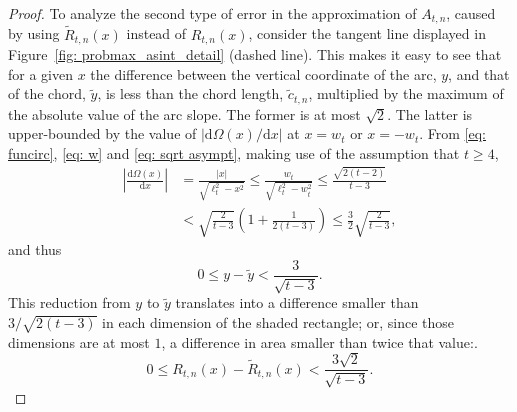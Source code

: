 \documentclass[12pt, a4paper]{article}
\newcommand{\diff}{\mathrm d}
\newcommand{\len}{\ell} %
\newcommand{\tiles}{t} %
\newcommand{\funcirc}{\Omega}
\begin{document}
\begin{proof}
To analyze the second type of error in the approximation of $A_{\tiles,n}$, caused by using $\tilde R_{\tiles,n}(x)$ instead of $R_{\tiles,n}(x)$, consider the tangent line displayed in Figure~\ref{fig: probmax_asint_detail} (dashed line). This makes it easy to see that for a given $x$ the difference between the vertical coordinate of the arc, $y$, and that of the chord, $\tilde y$, is less than the chord length, $\tilde c_{\tiles,n}$, multiplied by the maximum of the absolute value of the arc slope. The former is at most $\sqrt{2}$. The latter is upper-bounded by the value of $|\diff \funcirc(x)/\diff x|$ at $x=w_\tiles$ or $x=-w_\tiles$. From \eqref{eq: funcirc}, \eqref{eq: w} and \eqref{eq: sqrt asympt}, making use of the assumption that $\tiles \geq 4$,
\begin{equation}
\label{eq: asympt slope bound}
\begin{split}
\left| \frac{\diff \funcirc(x)}{\diff x} \right| &= \frac{|x|}{\sqrt{\len_\tiles^2-x^2}} \leq \frac{w_\tiles}{\sqrt{\len_\tiles^2-w_\tiles^2}} \leq \frac{\sqrt{2(\tiles-2)}}{\tiles-3} \\
& < \sqrt{\frac 2 {\tiles-3}} \left(1 + \frac 1 {2(\tiles-3)} \right) \leq \frac 3 2 \sqrt{\frac 2 {\tiles-3}},
\end{split}
\end{equation}
and thus
\begin{equation}
\label{eq: y: arc - chord}
0 \leq y - \tilde y < \frac 3 {\sqrt{\tiles-3}}.
\end{equation}
This reduction from $y$ to $\tilde y$ translates into a difference smaller than $3 / \sqrt{2(\tiles-3)}$ in each dimension of the shaded rectangle; or, since those dimensions are at most $1$, a difference in area smaller than twice that value:.
\begin{equation}
\label{eq: R: arc - chord}
0 \leq R_{\tiles,n}(x) - \tilde R_{\tiles,n}(x) < \frac{3\sqrt{2}} {\sqrt{\tiles-3}}.
\end{equation}


\end{proof}
\end{document}
